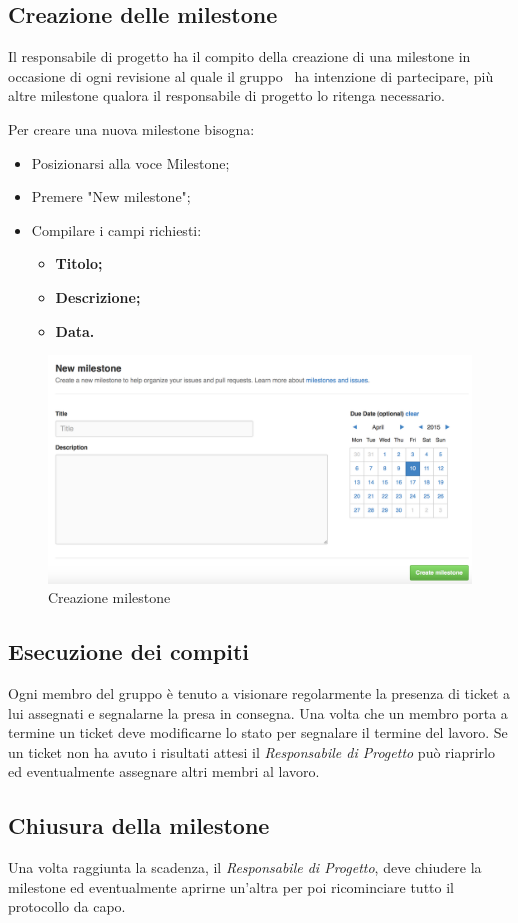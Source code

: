 \subsection{Creazione delle milestone}

Il responsabile di progetto ha il compito della creazione di una milestone in occasione di ogni revisione al quale il gruppo \GRUPPO\ ha intenzione di partecipare, più altre milestone qualora il responsabile di progetto lo ritenga necessario.

Per creare una nuova milestone bisogna:

\begin{itemize}
	\item Posizionarsi alla voce Milestone;
	\item Premere "New milestone";
	\item Compilare i campi richiesti:
		\begin{itemize}
			\item \textbf{Titolo;}
			\item \textbf{Descrizione;}
			\item \textbf{Data.}
		\end{itemize}
\end{itemize}
\begin{figure}[h]
\centering
\includegraphics[width=0.7\linewidth]{img/milestone}
\caption[Creazione milestone]{Creazione milestone}
\label{fig:milestone}
\end{figure}


\subsection{Esecuzione dei compiti}

Ogni membro del gruppo è tenuto a visionare regolarmente la presenza di ticket a lui assegnati e segnalarne la presa in consegna.
Una volta che un membro porta a termine un ticket deve modificarne lo stato per segnalare il termine del lavoro.
Se un ticket non ha avuto i risultati attesi il \textit{Responsabile di Progetto} può riaprirlo ed eventualmente assegnare altri membri al lavoro.

\subsection{Chiusura della milestone}

Una volta raggiunta la scadenza, il \textit{Responsabile di Progetto}, deve chiudere la milestone ed eventualmente aprirne un'altra per poi ricominciare tutto il protocollo da capo.